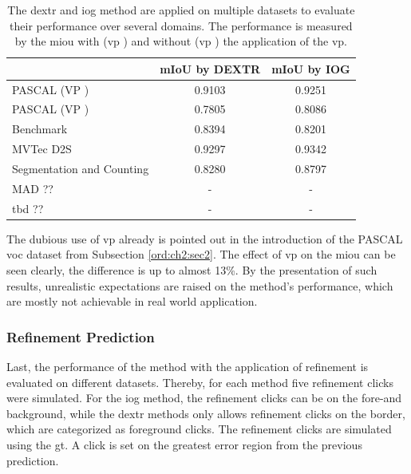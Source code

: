 \begin{table}[h!]
	\centering
	\begin{tabular}{l|c c}
		\toprule 		
										& mIoU by DEXTR & mIoU by IOG	\\
		\midrule
		PASCAL (VP \cmark)				& 0.9103 	& 0.9251	\\
		PASCAL (VP \xmark)				& 0.7805	& 0.8086	\\
		Benchmark 						& 0.8394 	& 0.8201	\\
		MVTec D2S \cite{Paddo18-D2S}	& 0.9297	& 0.9342	\\
		Segmentation and Counting		& 0.8280	& 0.8797 	\\
		MAD	??							& - 		& -		\\
		tbd	??							& -			& - 	\\									
		\bottomrule
	\end{tabular}
	\caption[Generalization of IOG and DEXTR]{
		The \gls{dextr} and \gls{iog} method are applied on multiple datasets to evaluate their performance over several domains.
		The performance is measured by the \gls{miou} with (\gls{vp} \cmark) and without (\gls{vp} \xmark) the application of the \gls{vp}.
	}\label{tab:ch5:tests_on_datasets}
\end{table}

The dubious use of \gls{vp} already is pointed out in the introduction of the PASCAL \gls{voc} dataset \cite{Eve20-PascalVOC} from Subsection \ref{ord:ch2:sec2}.
The effect of \gls{vp} on the \gls{miou} can be seen clearly, the difference is up to almost 13\%.
By the presentation of such results, unrealistic expectations are raised on the method's performance, which are mostly not achievable in real world application.

\subsubsection{Refinement Prediction}

Last, the performance of the method with the application of refinement is evaluated on different datasets.
Thereby, for each method five refinement clicks were simulated.
For the \gls{iog} method, the refinement clicks can be on the fore-and background, while the \gls{dextr} methods only allows refinement clicks on the border, which are categorized as foreground clicks.
The refinement clicks are simulated using the \gls{gt}.
A click is set on the greatest error region from the previous prediction.

